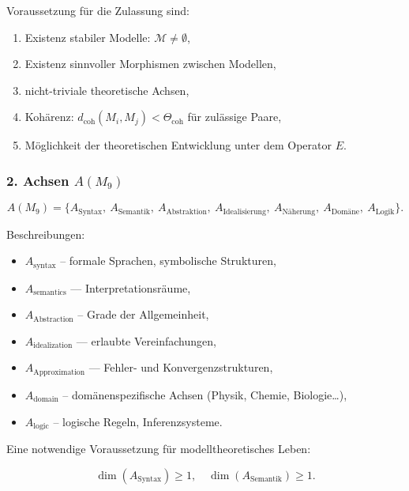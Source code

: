 Voraussetzung für die Zulassung sind:

\begin{enumerate}
    \item Existenz stabiler Modelle: $\mathcal{M}\neq\emptyset$,
    \item Existenz sinnvoller Morphismen zwischen Modellen,
    \item nicht-triviale theoretische Achsen,
    \item Kohärenz: $d_{\mathrm{coh}}(M_i, M_j)<\Theta_{\mathrm{coh}}$ für zulässige Paare,
    \item Möglichkeit der theoretischen Entwicklung unter dem Operator $E$.
\end{enumerate}

\subsubsection*{2. Achsen \texorpdfstring{$A(M_9)$}{A(M_9)}}

\[
A(M_9)=
\{
A_{\mathrm{Syntax}},\
A_{\mathrm{Semantik}},\
A_{\mathrm{Abstraktion}},\
A_{\mathrm{Idealisierung}},\
A_{\mathrm{Näherung}},\
A_{\mathrm{Domäne}},\
A_{\mathrm{Logik}}
\}.
\]

Beschreibungen:

\begin{itemize}
    \item $A_{\mathrm{syntax}}$ – formale Sprachen, symbolische Strukturen,
    \item $A_{\mathrm{semantics}}$ — Interpretationsräume,
    \item $A_{\mathrm{Abstraction}}$ – Grade der Allgemeinheit,
    \item $A_{\mathrm{idealization}}$ — erlaubte Vereinfachungen,
    \item $A_{\mathrm{Approximation}}$ — Fehler- und Konvergenzstrukturen,
    \item $A_{\mathrm{domain}}$ – domänenspezifische Achsen (Physik, Chemie, Biologie…),
    \item $A_{\mathrm{logic}}$ – logische Regeln, Inferenzsysteme.
\end{itemize}

Eine notwendige Voraussetzung für modelltheoretisches Leben:

\[
\dim(A_{\mathrm{Syntax}})\ge 1,
\quad
\dim(A_{\mathrm{Semantik}})\ge 1.
\]

